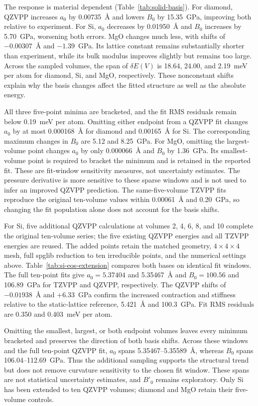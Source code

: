 

The response is material dependent (Table~\ref{tab:solid-basis}). For diamond, QZVPP increases $a_0$ by 0.00735~\AA{} and lowers $B_0$ by 15.35~GPa, improving both relative to experiment. For Si, $a_0$ decreases by 0.01950~\AA{} and $B_0$ increases by 5.70~GPa, worsening both errors. MgO changes much less, with shifts of $-0.00307$~\AA{} and $-1.39$~GPa. Its lattice constant remains substantially shorter than experiment, while its bulk modulus improves slightly but remains too large. Across the sampled volumes, the span of $\delta E(V)$ is 18.64, 24.00, and 2.19~meV per atom for diamond, Si, and MgO, respectively. These nonconstant shifts explain why the basis changes affect the fitted structure as well as the absolute energy.

All three five-point minima are bracketed, and the fit RMS residuals remain below 0.19~meV per atom. Omitting either endpoint from a QZVPP fit changes $a_0$ by at most 0.000168~\AA{} for diamond and 0.00165~\AA{} for Si. The corresponding maximum changes in $B_0$ are 5.12 and 8.25~GPa. For MgO, omitting the largest-volume point changes $a_0$ by only 0.000066~\AA{} and $B_0$ by 1.36~GPa. Its smallest-volume point is required to bracket the minimum and is retained in the reported fit. These are fit-window sensitivity measures, not uncertainty estimates. The pressure derivative is more sensitive to these sparse windows and is not used to infer an improved QZVPP prediction. The same-five-volume TZVPP fits reproduce the original ten-volume values within 0.00061~\AA{} and 0.20~GPa, so changing the fit population alone does not account for the basis shifts.

For Si, five additional QZVPP calculations at volumes 2, 4, 6, 8, and 10 complete the original ten-volume series; the five existing QZVPP energies and all TZVPP energies are reused. The added points retain the matched geometry, $4\times4\times4$ mesh, full spglib reduction to ten irreducible points, and the numerical settings above. Table~\ref{tab:si-eos-extension} compares both bases on identical fit windows. The full ten-point fits give $a_0=5.37404$ and 5.35467~\AA{} and $B_0=100.56$ and 106.89~GPa for TZVPP and QZVPP, respectively. The QZVPP shifts of $-0.01938$~\AA{} and $+6.33$~GPa confirm the increased contraction and stiffness relative to the static-lattice reference, 5.421~\AA{} and 100.3~GPa. Fit RMS residuals are 0.350 and 0.403~meV per atom.

Omitting the smallest, largest, or both endpoint volumes leaves every minimum bracketed and preserves the direction of both basis shifts. Across these windows and the full ten-point QZVPP fit, $a_0$ spans 5.35467--5.35589~\AA{}, whereas $B_0$ spans 106.04--112.69~GPa. Thus the additional sampling supports the structural trend but does not remove curvature sensitivity to the chosen fit window. These spans are not statistical uncertainty estimates, and $B'_0$ remains exploratory. Only Si has been extended to ten QZVPP volumes; diamond and MgO retain their five-volume controls.

